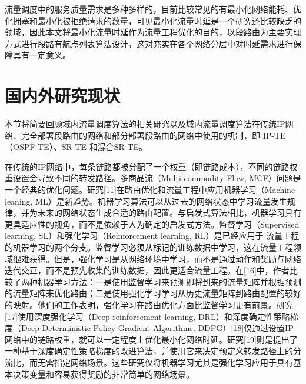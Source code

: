 流量调度中的服务质量需求是多种多样的，目前比较常见的有最小化网络能耗、优化拥塞和最小化被拒绝请求的数量，可见最小化流量时延是一个研究还比较缺乏的领域，因此本文将最小化流量时延作为流量工程优化的目的，以段路由为主要实现方式进行段路有航点列表算法设计，这对充实在各个网络分层中对时延需求进行保障具有一定意义。

\section{国内外研究现状}

本节将简要回顾域内流量调度算法的相关研究以及域内流量调度算法在传统IP网络、完全部署段路由的网络和部分部署段路由的网络中使用的机制，即 IP-TE（OSPF-TE）、SR-TE 和混合SR-TE。

在传统的IP网络中，每条链路都被分配了一个权重（即链路成本），不同的链路权重设置会导致不同的转发路径。多商品流（Multi-commodity Flow, MCF）问题是一个经典的优化问题。研究[11]在路由优化和流量工程中应用机器学习（Machine leaning, ML）是新趋势。机器学习算法可以从过去的网络状态中学习流量发生规律，并为未来的网络状态生成合适的路由配置。与启发式算法相比，机器学习具有更具适应性的视角，而不是依赖于人为确定的启发式方法。监督学习（Supervised learning, SL）和强化学习（Reinforcement learning, RL）是已经应用于 流量工程的机器学习的两个分支。监督学习必须从标记的训练数据中学习，这在流量工程领域很难获得。但是，强化学习是从网络环境中学习，而不是通过动作和奖励与网络迭代交互，而不是预先收集的训练数据，因此更适合流量工程。在[16]中，作者比较了两种机器学习方法：一是使用监督学习来预测即将到来的流量矩阵并根据预测的流量矩阵来优化路由；二是使用强化学习学习从历史流量矩阵到路由配置的较好的映射。他们的工作表明，强化学习在路由优化方面比监督学习更有前景。研究[17]使用深度强化学习（Deep reinforcement learning, DRL）和深度确定性策略梯度（Deep Deterministic Policy Gradient Algorithms, DDPG）[18]仅通过设置IP网络中的链路权重，就可以一定程度上优化最小化网络时延。研究[19]则是提出了一种基于深度确定性策略梯度的改进算法，并使用它来决定预定义转发路径上的分流比，而无需指定网络场景。这些研究仅将机器学习尤其是强化学习应用于具有基本决策变量和容易获得奖励的非常简单的网络场景。

